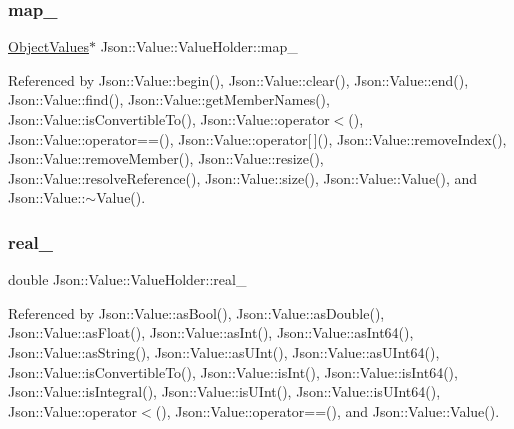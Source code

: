 \subsubsection{\texorpdfstring{map\+\_\+}{map\_}}
{\footnotesize\ttfamily \hyperlink{classJson_1_1Value_a08b6c80c3af7071d908dabf044de5388_a08b6c80c3af7071d908dabf044de5388}{Object\+Values}$\ast$ Json\+::\+Value\+::\+Value\+Holder\+::map\+\_\+}



Referenced by Json\+::\+Value\+::begin(), Json\+::\+Value\+::clear(), Json\+::\+Value\+::end(), Json\+::\+Value\+::find(), Json\+::\+Value\+::get\+Member\+Names(), Json\+::\+Value\+::is\+Convertible\+To(), Json\+::\+Value\+::operator$<$(), Json\+::\+Value\+::operator==(), Json\+::\+Value\+::operator\mbox{[}$\,$\mbox{]}(), Json\+::\+Value\+::remove\+Index(), Json\+::\+Value\+::remove\+Member(), Json\+::\+Value\+::resize(), Json\+::\+Value\+::resolve\+Reference(), Json\+::\+Value\+::size(), Json\+::\+Value\+::\+Value(), and Json\+::\+Value\+::$\sim$\+Value().

\mbox{\label{unionJson_1_1Value_1_1ValueHolder_af0c5ca724e5fe3a15db773d750e2351e_af0c5ca724e5fe3a15db773d750e2351e}} 
\subsubsection{\texorpdfstring{real\+\_\+}{real\_}}
{\footnotesize\ttfamily double Json\+::\+Value\+::\+Value\+Holder\+::real\+\_\+}



Referenced by Json\+::\+Value\+::as\+Bool(), Json\+::\+Value\+::as\+Double(), Json\+::\+Value\+::as\+Float(), Json\+::\+Value\+::as\+Int(), Json\+::\+Value\+::as\+Int64(), Json\+::\+Value\+::as\+String(), Json\+::\+Value\+::as\+U\+Int(), Json\+::\+Value\+::as\+U\+Int64(), Json\+::\+Value\+::is\+Convertible\+To(), Json\+::\+Value\+::is\+Int(), Json\+::\+Value\+::is\+Int64(), Json\+::\+Value\+::is\+Integral(), Json\+::\+Value\+::is\+U\+Int(), Json\+::\+Value\+::is\+U\+Int64(), Json\+::\+Value\+::operator$<$(), Json\+::\+Value\+::operator==(), and Json\+::\+Value\+::\+Value().

\mbox{\label{unionJson_1_1Value_1_1ValueHolder_a70ac2b153bc405527baa3850d2ddc3cb_a70ac2b153bc405527baa3850d2ddc3cb}} 
